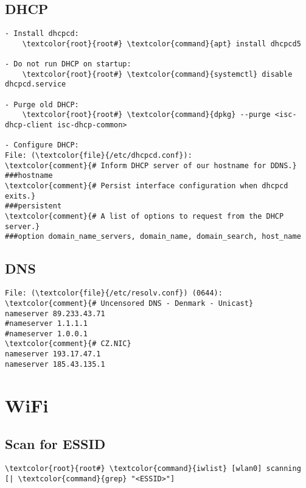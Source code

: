 \documentclass[10pt, a4paper, onecolumn, openany]{book} %
\begin{document}
\subsection{DHCP}
\begin{Verbatim}[commandchars=\\\{\}]
- Install dhcpcd:
    \textcolor{root}{root#} \textcolor{command}{apt} install dhcpcd5

- Do not run DHCP on startup:
    \textcolor{root}{root#} \textcolor{command}{systemctl} disable dhcpcd.service

- Purge old DHCP:
    \textcolor{root}{root#} \textcolor{command}{dpkg} --purge <isc-dhcp-client isc-dhcp-common>
    
- Configure DHCP:
File: (\textcolor{file}{/etc/dhcpcd.conf}):
\textcolor{comment}{# Inform DHCP server of our hostname for DDNS.}
###hostname
\textcolor{comment}{# Persist interface configuration when dhcpcd exits.}
###persistent
\textcolor{comment}{# A list of options to request from the DHCP server.}
###option domain_name_servers, domain_name, domain_search, host_name
\end{Verbatim}

\subsection{DNS}
\begin{Verbatim}[commandchars=\\\{\}]
File: (\textcolor{file}{/etc/resolv.conf}) (0644):
\textcolor{comment}{# Uncensored DNS - Denmark - Unicast}
nameserver 89.233.43.71
#nameserver 1.1.1.1
#nameserver 1.0.0.1
\textcolor{comment}{# CZ.NIC}
nameserver 193.17.47.1
nameserver 185.43.135.1
\end{Verbatim}


\section{WiFi}
\subsection{Scan for ESSID}
\begin{Verbatim}[commandchars=\\\{\}]
    \textcolor{root}{root#} \textcolor{command}{iwlist} [wlan0] scanning [| \textcolor{command}{grep} "<ESSID>"]
\end{Verbatim}
\end{document}
